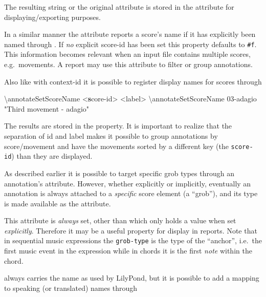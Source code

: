 \documentclass[]{ollmanual}
\newenvironment{Shaded}{}{}
\newcommand{\DataTypeTok}[1]{\textcolor[rgb]{0.56,0.13,0.00}{#1}}
\newcommand{\ErrorTok}[1]{\textcolor[rgb]{1.00,0.00,0.00}{\textbf{#1}}}
\newcommand{\FunctionTok}[1]{\textcolor[rgb]{0.02,0.16,0.49}{#1}}
\newcommand{\NormalTok}[1]{#1}
\newcommand{\StringTok}[1]{\textcolor[rgb]{0.25,0.44,0.63}{#1}}
\begin{document}
The resulting string or the original attribute is stored in the
 attribute for displaying/exporting purposes.


In a similar manner the  attribute reports a score's
name if it has explicitly been named through
. If \emph{no} explicit score-id has
been set this property defaults to \texttt{\#f}. This information
becomes relevant when an input file contains multiple scores,
e.g.~movements. A report may use this attribute to filter or group
annotations.

Also like with context-id it is possible to register display names for
scores through

\begin{Shaded}
\begin{Highlighting}[]
\FunctionTok{\textbackslash{}annotateSetScoreName} \DataTypeTok{<}\ErrorTok{s}\NormalTok{core-id> }\DataTypeTok{<}\NormalTok{label>}
\FunctionTok{\textbackslash{}annotateSetScoreName}\NormalTok{ 03-adagio "}\StringTok{Third movement - adagio"}
\end{Highlighting}
\end{Shaded}

The results are stored in the  property. It is
important to realize that the separation of id and label makes it
possible to group annotations by score/movement and have the movements
sorted by a different key (the \texttt{score-id}) than they are
displayed.


As described earlier it is possible to target specific grob types
through an annotation's  attribute. However, whether
explicitly or implicitly, eventually an annotation is always attached to
a \emph{specific} score element (a ``grob''), and its type is made
available as the  attribute.

This attribute is \emph{always} set, other than  which only
holds a value when set \emph{explicitly}. Therefore it may be a useful
property for display in reports. Note that in sequential music
expressions the \texttt{grob-type} is the type of the ``anchor'',
i.e.~the first music event in the expression while in chords it is the
first \emph{note} within the chord.

 always carries the name as used by LilyPond, but it
is possible to add a mapping to speaking (or translated) names through
\end{document}
